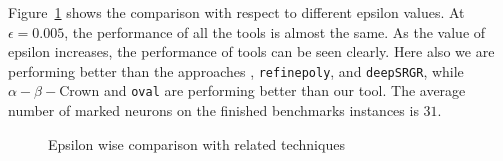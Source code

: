 Figure~\ref{res:ep:milp_with_milp} shows the comparison with respect to different epsilon values. 
At $\epsilon=0.005$, the performance of all the tools is almost the same. As the value of epsilon increases, the 
performance of tools can be seen clearly. Here also we are performing better than the approaches \deeppoly{}, 
\texttt{refinepoly}, and \texttt{deepSRGR},
while $\alpha - \beta -$Crown and \texttt{oval} are performing better than our tool. 
The average number of marked neurons on the finished benchmarks instances is $31$. 


\begin{figure}
    \centering
    
    \caption{Epsilon wise comparison with related techniques}
    \label{res:ep:milp_with_milp}
\end{figure}
